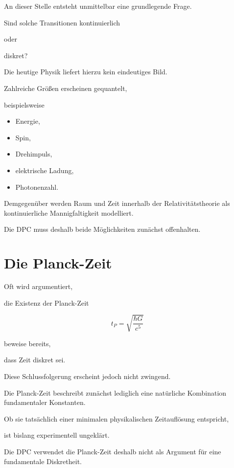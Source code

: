 \documentclass[11pt,a4paper]{article}
\begin{document}
An dieser Stelle entsteht unmittelbar eine grundlegende
Frage.

Sind solche Transitionen kontinuierlich

oder

diskret?

Die heutige Physik liefert hierzu kein eindeutiges Bild.

Zahlreiche Größen erscheinen gequantelt,

beispielsweise

\begin{itemize}

\item Energie,

\item Spin,

\item Drehimpuls,

\item elektrische Ladung,

\item Photonenzahl.

\end{itemize}

Demgegenüber werden Raum und Zeit innerhalb der
Relativitätstheorie als kontinuierliche Mannigfaltigkeit
modelliert.

Die DPC muss deshalb beide Möglichkeiten zunächst
offenhalten.

\section{Die Planck-Zeit}

Oft wird argumentiert,

die Existenz der Planck-Zeit

\[
t_P
=
\sqrt{\frac{\hbar G}{c^5}}
\]

beweise bereits,

dass Zeit diskret sei.

Diese Schlussfolgerung erscheint jedoch nicht zwingend.

Die Planck-Zeit beschreibt zunächst lediglich eine
natürliche Kombination fundamentaler Konstanten.

Ob sie tatsächlich einer minimalen physikalischen
Zeitauflösung entspricht,

ist bislang experimentell ungeklärt.

Die DPC verwendet die Planck-Zeit deshalb nicht als
Argument für eine fundamentale Diskretheit.
\end{document}
